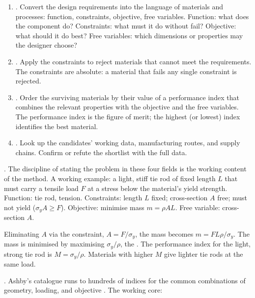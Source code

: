 \begin{enumerate}[leftmargin=*]
\item {}. Convert the design requirements into the
  language of materials and processes: function, constraints,
  objective, free variables. Function: what does the component do?
  Constraints: what must it do without fail? Objective: what should
  it do best? Free variables: which dimensions or properties may the
  designer choose?
\item {}. Apply the constraints to reject materials
  that cannot meet the requirements. The constraints are absolute:
  a material that fails any single constraint is rejected.
\item {}. Order the surviving materials by their
  value of a performance index that combines the relevant
  properties with the objective and the free variables. The
  performance index is the figure of merit; the highest (or lowest)
  index identifies the best material.
\item {}. Look up the candidates' working data,
  manufacturing routes, and supply chains. Confirm or refute the
  shortlist with the full data.
\end{enumerate}

. The discipline of stating the problem in these four
fields is the working content of the method. A working example: a
light, stiff tie rod of fixed length $L$ that must carry a tensile
load $F$ at a stress below the material's yield strength. Function:
tie rod, tension. Constraints: length $L$ fixed; cross-section $A$
free; must not yield ($\sigma_y A \geq F$). Objective: minimise mass
$m = \rho A L$. Free variable: cross-section $A$.

Eliminating $A$ via the constraint, $A = F / \sigma_y$, the mass
becomes $m = F L \rho / \sigma_y$. The mass is minimised by
maximising $\sigma_y / \rho$, the . The
performance index for the light, strong tie rod is $M = \sigma_y /
\rho$. Materials with higher $M$ give lighter tie rods at the same
load.

. Ashby's catalogue
runs to hundreds of indices for the common combinations of geometry,
loading, and objective \cite[Appendix B]{text:ashby2017}. The
working core:

